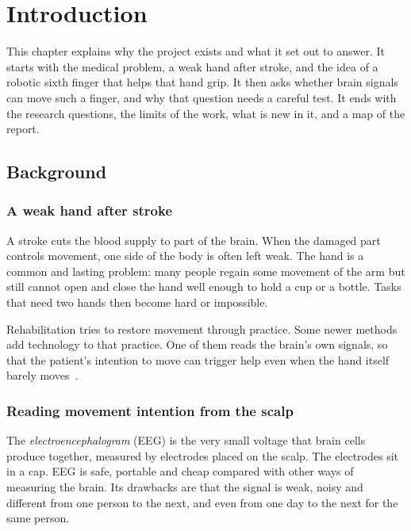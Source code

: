 \chapter{Introduction}\label{ch:intro}

This chapter explains why the project exists and what it set out to answer. It starts
with the medical problem, a weak hand after stroke, and the idea of a robotic sixth finger
that helps that hand grip. It then asks whether brain signals can move such a finger, and
why that question needs a careful test. It ends with the research questions, the limits of
the work, what is new in it, and a map of the report.

\section{Background}\label{sec:intro-background}

\subsection{A weak hand after stroke}
A stroke cuts the blood supply to part of the brain. When the damaged part controls
movement, one side of the body is often left weak. The hand is a common and lasting
problem: many people regain some movement of the arm but still cannot open and close
the hand well enough to hold a cup or a bottle. Tasks that need two hands then become
hard or impossible.

Rehabilitation tries to restore movement through practice. Some newer methods add
technology to that practice. One of them reads the brain's own signals, so that the
patient's intention to move can trigger help even when the hand itself barely
moves~\cite{cervera2018,biasiucci2018,pichiorri2015}.

\subsection{Reading movement intention from the scalp}
The \emph{electroencephalogram} (EEG) is the very small voltage that brain cells produce
together, measured by electrodes placed on the scalp. The electrodes sit in a cap. EEG is safe, portable and cheap compared with other ways
of measuring the brain. Its drawbacks are that the signal is weak, noisy and different from
one person to the next, and even from one day to the next for the same person.

